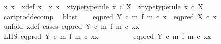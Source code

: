 \begin{isabellebody}
\ x{}\ x{}\ \ x{\isacharunderscore}{\kern0pt}def{\isacharcolon}{\kern0pt}\ {\isachardoublequoteopen}x\ {\isacharequal}{\kern0pt}\ {\isasymlangle}x{}{\isacharcomma}{\kern0pt}\ x{}{\isasymrangle}{\isachardoublequoteclose}\ \ x{}{\isacharunderscore}{\kern0pt}type{\isacharbrackleft}{\kern0pt}type{\isacharunderscore}{\kern0pt}rule{\isacharbrackright}{\kern0pt}{\isacharcolon}{\kern0pt}\ {\isachardoublequoteopen}x{}\ {\isasymin}\isactrlsub c\ X{\isachardoublequoteclose}\ \ x{}{\isacharunderscore}{\kern0pt}type{\isacharbrackleft}{\kern0pt}type{\isacharunderscore}{\kern0pt}rule{\isacharbrackright}{\kern0pt}{\isacharcolon}{\kern0pt}\ {\isachardoublequoteopen}x{}\ {\isasymin}\isactrlsub c\ X{\isachardoublequoteclose}\isanewline
\ \ \ \ \isamarkupfalse%
\ cart{\isacharunderscore}{\kern0pt}prod{\isacharunderscore}{\kern0pt}decomp\ \isamarkupfalse%
\ blast\isanewline
\ \ \isamarkupfalse%
\ {\isachardoublequoteopen}{\isacharparenleft}{\kern0pt}eq{\isacharunderscore}{\kern0pt}pred\ Y\ {\isasymcirc}\isactrlsub c\ m\ {\isasymtimes}\isactrlsub f\ m{\isacharparenright}{\kern0pt}\ {\isasymcirc}\isactrlsub c\ x\ {\isacharequal}{\kern0pt}\ eq{\isacharunderscore}{\kern0pt}pred\ X\ {\isasymcirc}\isactrlsub c\ x{\isachardoublequoteclose}\isanewline
\ \ \isamarkupfalse%
\ {\isacharparenleft}{\kern0pt}unfold\ x{\isacharunderscore}{\kern0pt}def{\isacharcomma}{\kern0pt}\ cases\ {\isachardoublequoteopen}{\isacharparenleft}{\kern0pt}eq{\isacharunderscore}{\kern0pt}pred\ Y\ {\isasymcirc}\isactrlsub c\ m\ {\isasymtimes}\isactrlsub f\ m{\isacharparenright}{\kern0pt}\ {\isasymcirc}\isactrlsub c\ {\isasymlangle}x{}{\isacharcomma}{\kern0pt}x{}{\isasymrangle}\ {\isacharequal}{\kern0pt}\ {\isasymt}{\isachardoublequoteclose}{\isacharparenright}{\kern0pt}\isanewline
\ \ \ \ \isamarkupfalse%
\ LHS{\isacharcolon}{\kern0pt}\ {\isachardoublequoteopen}{\isacharparenleft}{\kern0pt}eq{\isacharunderscore}{\kern0pt}pred\ Y\ {\isasymcirc}\isactrlsub c\ m\ {\isasymtimes}\isactrlsub f\ m{\isacharparenright}{\kern0pt}\ {\isasymcirc}\isactrlsub c\ {\isasymlangle}x{}{\isacharcomma}{\kern0pt}x{}{\isasymrangle}\ {\isacharequal}{\kern0pt}\ {\isasymt}{\isachardoublequoteclose}\isanewline
\ \ \ \ \isamarkupfalse%
\ \isamarkupfalse%
\ {\isachardoublequoteopen}eq{\isacharunderscore}{\kern0pt}pred\ Y\ {\isasymcirc}\isactrlsub c\ {\isacharparenleft}{\kern0pt}m\ {\isasymtimes}\isactrlsub f\ m{\isacharparenright}{\kern0pt}\ {\isasymcirc}\isactrlsub c\ {\isasymlangle}x{}{\isacharcomma}{\kern0pt}x{}{\isasymrangle}\ {\isacharequal}{\kern0pt}\ {\isasymt}{\isachardoublequoteclose}\isanewline

\end{isabellebody}
